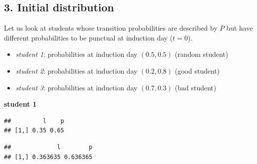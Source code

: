 \documentclass[]{article}
\newenvironment{Shaded}{\begin{snugshade}}{\end{snugshade}}
\newcommand{\CommentTok}[1]{\textcolor[rgb]{0.56,0.35,0.01}{\textit{#1}}}
\newcommand{\DecValTok}[1]{\textcolor[rgb]{0.00,0.00,0.81}{#1}}
\newcommand{\FloatTok}[1]{\textcolor[rgb]{0.00,0.00,0.81}{#1}}
\newcommand{\KeywordTok}[1]{\textcolor[rgb]{0.13,0.29,0.53}{\textbf{#1}}}
\newcommand{\NormalTok}[1]{#1}
\newcommand{\OperatorTok}[1]{\textcolor[rgb]{0.81,0.36,0.00}{\textbf{#1}}}
\newcommand{\StringTok}[1]{\textcolor[rgb]{0.31,0.60,0.02}{#1}}
\providecommand{\tightlist}{%
  \setlength{\itemsep}{0pt}\setlength{\parskip}{0pt}}
\begin{document}
\hypertarget{initial-distribution}{%
\subsection{3. Initial distribution}\label{initial-distribution}}

Let us look at students whose transition probabilities are described by
\(P\) but have different probabilities to be punctual at induction day
(\(t = 0\)).

\begin{itemize}
\tightlist
\item
  \emph{student 1}: probabilities at induction day \((0.5, 0.5)\)
  (random student)
\item
  \emph{student 2}: probabilities at induction day \((0.2, 0.8)\) (good
  student)
\item
  \emph{student 3}: probabilities at induction day \((0.7, 0.3)\) (bad
  student)
\end{itemize}

\textbf{student 1}

\begin{Shaded}
\end{Shaded}

\begin{verbatim}
##         l    p
## [1,] 0.35 0.65
\end{verbatim}

\begin{Shaded}
\end{Shaded}

\begin{verbatim}
##             l        p
## [1,] 0.363635 0.636365
\end{verbatim}

\begin{Shaded}
\end{Shaded}
\end{document}
